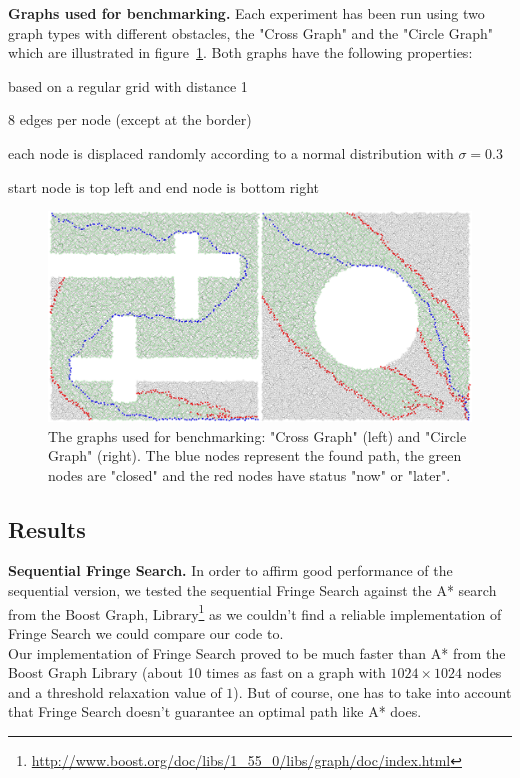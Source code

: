 \documentclass[letterpaper]{article}
\newcommand{\mypar}[1]{{\bf #1.}}
\begin{document}
\mypar{Graphs used for benchmarking}
Each experiment has been run using two graph types with different obstacles, the "Cross Graph" and the "Circle Graph" which are illustrated in figure~\ref{fig:graphs}. Both graphs have the following properties:
\begin{compactitem}
\item based on a regular grid with distance 1
\item 8 edges per node (except at the border)
\item each node is displaced randomly according to a normal distribution with $\sigma = 0.3$
\item start node is top left and end node is bottom right
\end{compactitem}

\begin{figure}[h]\centering
  \includegraphics[scale=0.3]{benchmark_graphs.eps}
  \caption{The graphs used for benchmarking: "Cross Graph" (left) and "Circle Graph" (right). The blue nodes represent the found path, the green nodes are "closed" and the red nodes have status "now" or "later". \label{fig:graphs}}
\end{figure}

\subsection{Results}\label{ssec:results}

\mypar{Sequential Fringe Search}
In order to affirm good performance of the sequential version, we tested the sequential Fringe Search against the A* search from the Boost Graph, Library\footnote{\url{http://www.boost.org/doc/libs/1_55_0/libs/graph/doc/index.html}} as we couldn't find a reliable implementation of Fringe Search we could compare our code to.\\
Our implementation of Fringe Search proved to be much faster than A* from the Boost Graph Library (about 10 times as fast on a graph with $1024 \times 1024$ nodes and a threshold relaxation value of $1$). But of course, one has to take into account that Fringe Search doesn't guarantee an optimal path like A* does.
\end{document}
